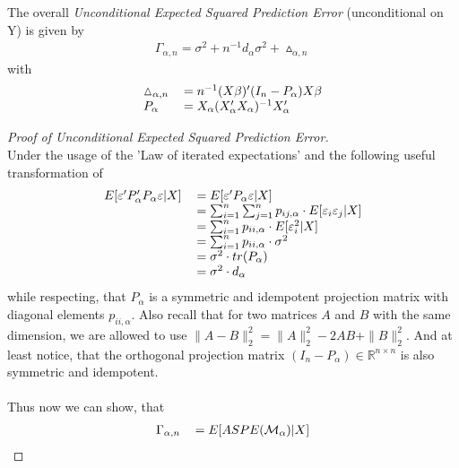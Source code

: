 \documentclass[Research_Module_ES.tex]{subfiles}
\begin{document}
The overall \textit{Unconditional Expected Squared Prediction Error} (unconditional on Y) is given by 
\begin{align*}
\Gamma_{\alpha,n}=\sigma^2+n^{-1}d_\alpha\sigma^2+\vartriangle_{\alpha,n}
\end{align*}
with
\begin{align*}
\begin{tabular}{ll}
$\vartriangle_{\alpha,n}$&$=n^{-1}(X\beta)^\prime(I_n-P_\alpha)X\beta$\\
$P_\alpha$&$=X_\alpha(X_\alpha^\prime X_\alpha)^{-1}X_\alpha^\prime$
\end{tabular}
\end{align*}

\begin{proof}[Proof of Unconditional Expected Squared Prediction Error]~\\
	Under the usage of the 'Law of iterated expectations' and the following useful transformation of
	\begin{align*}
	\begin{tabular}{ll}
	$E[\varepsilon^\prime P_\alpha^\prime P_\alpha\varepsilon|X]$&$=E[\varepsilon^\prime P_\alpha\varepsilon|X]$\\
	&$=\sum_{i=1}^{n}\sum_{j=1}^{n}p_{ij,\alpha}\cdot E[\varepsilon_i\varepsilon_j|X]$\\
	&$=\sum_{i=1}^{n}p_{ii,\alpha}\cdot E[\varepsilon_i^2|X]$\\
	&$=\sum_{i=1}^{n}p_{ii,\alpha}\cdot \sigma^2$\\
	&$=\sigma^2\cdot tr(P_\alpha)$\\
	&$=\sigma^2\cdot d_\alpha$
	\end{tabular}
	\end{align*}
	while respecting, that $P_\alpha$ is a symmetric and idempotent projection matrix with diagonal elements $p_{ii,\alpha}$. Also recall that for two matrices $A$ and $B$ with the same dimension, we are allowed to use $\parallel A-B\parallel_2^2=\parallel A\parallel_2^2-2AB+\parallel B\parallel_2^2$. And at least notice, that the orthogonal projection matrix $(I_n-P_\alpha)\in\mathbb{R}^{n\times n}$ is also symmetric and idempotent.\\\\
	Thus now we can show, that
	\begin{align*}
	\begin{tabular}{ll}
	$\Gamma_{\alpha,n}$&$=E[ASPE(\mathcal{M}_\alpha)|X]$\\

\end{tabular}
\end{align*}
\end{proof}
\end{document}
